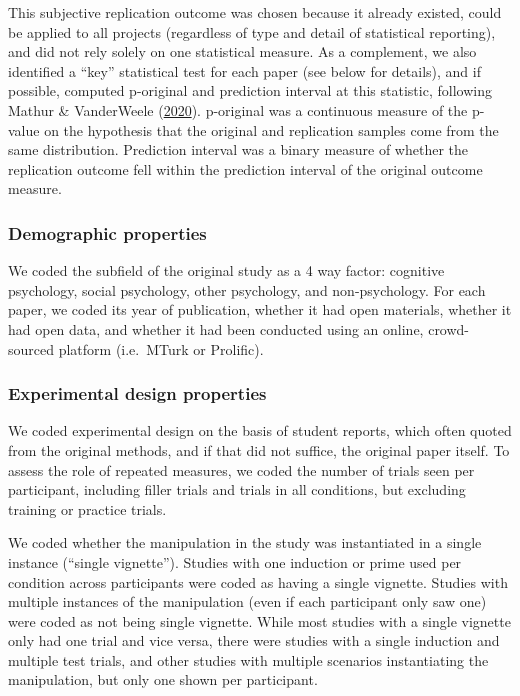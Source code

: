 \documentclass[
  english,
  a4paper,
]{article}
\begin{document}
This subjective replication outcome was chosen because it already existed, could be applied to all projects (regardless of type and detail of statistical reporting), and did not rely solely on one statistical measure. As a complement, we also identified a ``key'' statistical test for each paper (see below for details), and if possible, computed p-original and prediction interval at this statistic, following Mathur \& VanderWeele (\protect\hyperlink{ref-mathur2020}{2020}). p-original was a continuous measure of the p-value on the hypothesis that the original and replication samples come from the same distribution. Prediction interval was a binary measure of whether the replication outcome fell within the prediction interval of the original outcome measure.

\hypertarget{demographic-properties}{%
\subsubsection{Demographic properties}\label{demographic-properties}}

We coded the subfield of the original study as a 4 way factor: cognitive psychology, social psychology, other psychology, and non-psychology. For each paper, we coded its year of publication, whether it had open materials, whether it had open data, and whether it had been conducted using an online, crowd-sourced platform (i.e.~MTurk or Prolific).

\hypertarget{experimental-design-properties}{%
\subsubsection{Experimental design properties}\label{experimental-design-properties}}

We coded experimental design on the basis of student reports, which often quoted from the original methods, and if that did not suffice, the original paper itself. To assess the role of repeated measures, we coded the number of trials seen per participant, including filler trials and trials in all conditions, but excluding training or practice trials.

We coded whether the manipulation in the study was instantiated in a single instance (``single vignette''). Studies with one induction or prime used per condition across participants were coded as having a single vignette. Studies with multiple instances of the manipulation (even if each participant only saw one) were coded as not being single vignette. While most studies with a single vignette only had one trial and vice versa, there were studies with a single induction and multiple test trials, and other studies with multiple scenarios instantiating the manipulation, but only one shown per participant.
\end{document}
